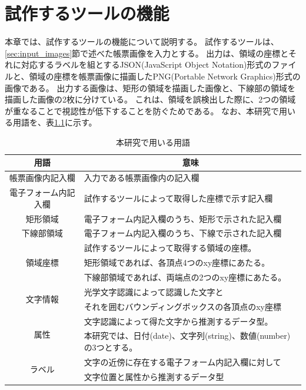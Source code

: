 \chapter{試作するツールの機能}\label{cha:Function}
本章では、試作するツールの機能について説明する。
試作するツールは、\ref{sec:input_images}節で述べた帳票画像を入力とする。
出力は、領域の座標とそれに対応するラベルを組とするJSON(JavaScript Object Notation)形式のファイルと、領域の座標を帳票画像に描画したPNG(Portable Network Graphics)形式の画像である。
出力する画像は、矩形の領域を描画した画像と、下線部の領域を描画した画像の2枚に分けている。
これは、領域を誤検出した際に、2つの領域が重なることで視認性が低下することを防ぐためである。
なお、本研究で用いる用語を、表\ref{tb:term}に示す。

\begin{table}[tp]
	\caption{本研究で用いる用語}
	\label{tb:term}
	\centering
	\begin{tabular}{|c||l|}
        \hline
		用語 & \multicolumn{1}{c|}{意味} \\
        \hline \hline
		帳票画像内記入欄 & 入力である帳票画像内の記入欄 \\
        \hline
		電子フォーム内記入欄 & 試作するツールによって取得した座標で示す記入欄 \\
        \hline
		矩形領域 & 電子フォーム内記入欄のうち、矩形で示された記入欄 \\
        \hline
		下線部領域 & 電子フォーム内記入欄のうち、下線で示された記入欄 \\
        \hline
        \multirow{3}{*}{領域座標} & 試作するツールによって取得する領域の座標。 \\
                                    & 矩形領域であれば、各頂点4つのxy座標にあたる。 \\
                                    & 下線部領域であれば、両端点の2つのxy座標にあたる。 \\
        \hline
        \multirow{2}{*}{文字情報} & 光学文字認識によって認識した文字と \\
                                    & それを囲むバウンディングボックスの各頂点のxy座標 \\
        \hline
        \multirow{2}{*}{属性} & 文字認識によって得た文字から推測するデータ型。 \\
                                & 本研究では、日付(date)、文字列(string)、数値(number)の3つとする。\\
        \hline
        \multirow{2}{*}{ラベル} & 文字の近傍に存在する電子フォーム内記入欄に対して\\
                                    & 文字位置と属性から推測するデータ型 \\
        \hline
	\end{tabular}
\end{table}

